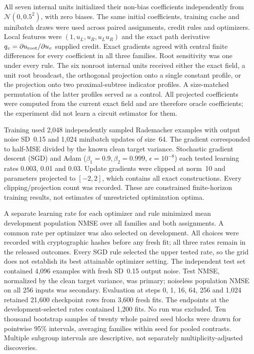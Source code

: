 All seven internal units initialized their non-bias coefficients independently from $\mathcal N(0,0.5^2)$, with zero biases. The same initial coefficients, training cache and minibatch draws were used across paired assignments, credit rules and optimizers. Local features were $(1,u_L,u_R,u_Lu_R)$ and the exact path derivative $q_v=\partial u_{\rm root}/\partial u_v$ supplied credit. Exact gradients agreed with central finite differences for every coefficient in all three families. Root sensitivity was one under every rule. The six nonroot internal units received either the exact field, a unit root broadcast, the orthogonal projection onto a single constant profile, or the projection onto two proximal-subtree indicator profiles. A size-matched permutation of the latter profiles served as a control. All projected coefficients were computed from the current exact field and are therefore oracle coefficients; the experiment did not learn a circuit estimator for them.

Training used 2,048 independently sampled Rademacher examples with output noise SD~0.15 and 1,024 minibatch updates of size~64. The gradient corresponded to half-MSE divided by the known clean target variance. Stochastic gradient descent (SGD) and Adam ($\beta_1=0.9,\beta_2=0.999$, $\epsilon=10^{-8}$) each tested learning rates 0.003, 0.01 and 0.03. Update gradients were clipped at norm~10 and parameters projected to $[-2,2]$, which contains all exact constructions. Every clipping/projection count was recorded. These are constrained finite-horizon training results, not estimates of unrestricted optimization optima.

A separate learning rate for each optimizer and rule minimized mean development population NMSE over all families and both assignments. A common rate per optimizer was also selected on development. All choices were recorded with cryptographic hashes before any fresh fit; all three rates remain in the released outcomes. Every SGD rule selected the upper tested rate, so the grid does not establish its best attainable optimizer setting. The independent test set contained 4,096 examples with fresh SD~0.15 output noise. Test NMSE, normalized by the clean target variance, was primary; noiseless population NMSE on all 256 inputs was secondary. Evaluation at steps 0, 1, 16, 64, 256 and 1,024 retained 21,600 checkpoint rows from 3,600 fresh fits. The endpoints at the development-selected rates contained 1,200 fits. No run was excluded. Ten thousand bootstrap samples of twenty whole paired seed blocks were drawn for pointwise 95\% intervals, averaging families within seed for pooled contrasts. Multiple subgroup intervals are descriptive, not separately multiplicity-adjusted discoveries.

